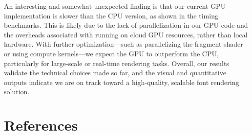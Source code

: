 \documentclass[11pt]{article}
\begin{document}
An interesting and somewhat unexpected finding is that our current GPU implementation is slower than the CPU version, as shown in the timing benchmarks. This is likely due to the lack of parallelization in our GPU code and the overheads associated with running on cloud GPU resources, rather than local hardware. With further optimization---such as parallelizing the fragment shader or using compute kernels---we expect the GPU to outperform the CPU, particularly for large-scale or real-time rendering tasks. Overall, our results validate the technical choices made so far, and the visual and quantitative outputs indicate we are on track toward a high-quality, scalable font rendering solution. \\

\section{References}
\end{document}
